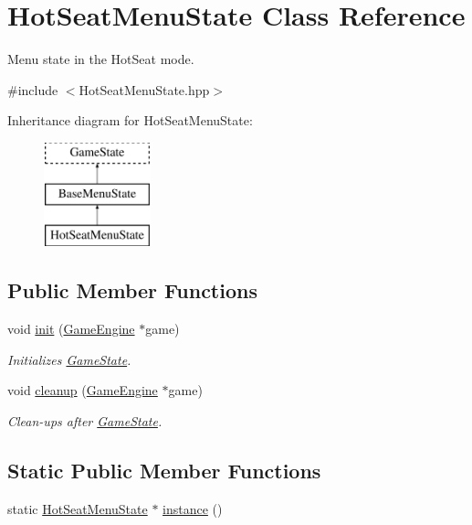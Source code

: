 \hypertarget{class_hot_seat_menu_state}{}\section{Hot\+Seat\+Menu\+State Class Reference}
\label{class_hot_seat_menu_state}


Menu state in the Hot\+Seat mode.  




{\ttfamily \#include $<$Hot\+Seat\+Menu\+State.\+hpp$>$}

Inheritance diagram for Hot\+Seat\+Menu\+State\+:\begin{figure}[H]
\begin{center}
\leavevmode
\includegraphics[height=3.000000cm]{class_hot_seat_menu_state}
\end{center}
\end{figure}
\subsection*{Public Member Functions}
\begin{DoxyCompactItemize}
\item 
void \mbox{\hyperlink{class_hot_seat_menu_state_a29beb4656c180d0cfc3b8ca20ae2d172}{init}} (\mbox{\hyperlink{class_game_engine}{Game\+Engine}} $\ast$game)
\begin{DoxyCompactList}\small\item\em Initializes \mbox{\hyperlink{class_game_state}{Game\+State}}. \end{DoxyCompactList}\item 
void \mbox{\hyperlink{class_hot_seat_menu_state_ada87b1a00943777a31b8b24ddf347350}{cleanup}} (\mbox{\hyperlink{class_game_engine}{Game\+Engine}} $\ast$game)
\begin{DoxyCompactList}\small\item\em Clean-\/ups after \mbox{\hyperlink{class_game_state}{Game\+State}}. \end{DoxyCompactList}\end{DoxyCompactItemize}
\subsection*{Static Public Member Functions}
\begin{DoxyCompactItemize}
\item 
static \mbox{\hyperlink{class_hot_seat_menu_state}{Hot\+Seat\+Menu\+State}} $\ast$ \mbox{\hyperlink{class_hot_seat_menu_state_aaeccf26a726ce9793b0e6acf104c21b6}{instance}} ()
\end{DoxyCompactItemize}
